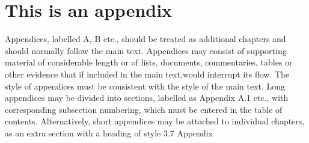 \documentclass[../Thesis]{subfiles}
\begin{document}
\chapter{This is an appendix}
Appendices, labelled A, B etc., should be treated as additional chapters and should normally follow the main text. Appendices may consist of supporting material of considerable length or of lists, documents, commentaries, tables or other evidence that if included in the main text,would interrupt its flow. The style of appendices must be consistent with the style of the main text. Long appendices may be divided into sections, labelled as Appendix A.1 etc., with corresponding subsection numbering, which must be entered in the table of contents. Alternatively, short appendices may be attached to individual chapters, as an extra section with a heading of style 3.7 Appendix
\end{document}

